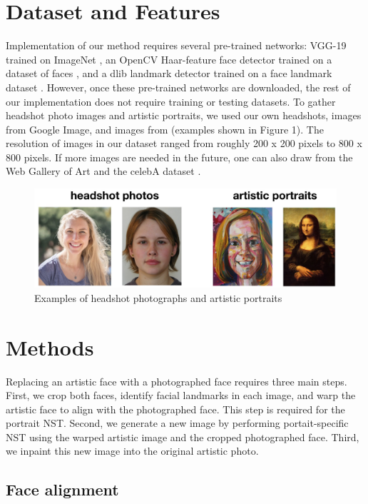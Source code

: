 \documentclass{article}
\begin{document}
\section{Dataset and Features}

Implementation of our method requires several pre-trained networks: VGG-19 trained on ImageNet \cite{Simonyan14c}, an OpenCV Haar-feature face detector trained on a dataset of faces \cite{opencv_library}, and a dlib landmark detector trained on a face landmark dataset \cite{dlib09}. However, once these pre-trained networks are downloaded, the rest of our implementation does not require training or testing datasets. To gather headshot photo images and artistic portraits, we used our own headshots, images from Google Image, and images from \cite{selim2016painting} (examples shown in Figure 1). The resolution of images in our dataset ranged from roughly 200 x 200 pixels to 800 x 800 pixels. If more images are needed in the future, one can also draw from the Web Gallery of Art \cite{WebGallery} and the celebA dataset \cite{liu2018large}.

\begin{figure}[H]
  \begin{center}
    \includegraphics[width=.6\textwidth]{example_images2.jpg}
    \caption{Examples of headshot photographs and artistic portraits} \label{fig:examples}
  \end{center}
\end{figure} 

\section{ Methods }

Replacing an artistic face with a photographed face requires three main steps. First, we crop both faces, identify facial landmarks in each image, and warp the artistic face to align with the photographed face. This step is required for the portrait NST. Second, we generate a new image by performing portait-specific NST using the warped artistic image and the cropped photographed face. Third, we inpaint this new image into the original artistic photo. 

\subsection{Face alignment}
\end{document}
